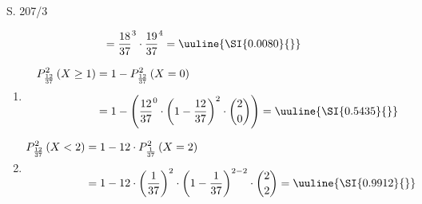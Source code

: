 \begin{Exercise}{S. 207/3}{}
\begin{enumerate}[leftmargin=*]
{\begin{enumerate}[label=\alph*),leftmargin=*]
{\begin{align*}
                    &= \dfrac{18}{37}^{3} \cdot \dfrac{19}{37}^{4} = \uuline{\SI{0.0080}{}}
                \end{align*}
                }
        \end{enumerate}
        \begin{enumerate}[label=\alph*),leftmargin=*]
            \item[b1)] {
                \begin{align*}
                    P_{\frac{12}{37}}^{2}\left(X \geq 1\right) &= 1 - P_{\frac{12}{37}}^{2}\left(X = 0\right)\\[1.5ex]
                    &= 1 - \left(\dfrac{12}{37}^{0} \cdot \left(1 - \dfrac{12}{37}\right)^{2} \cdot \binom{2}{0}\right) = \uuline{\SI{0.5435}{}}
                \end{align*}
                }
            \item[b2)] {
                \begin{align*}
                    P_{\frac{12}{37}}^{2}\left(X < 2\right) &= 1 - 12 \cdot P_{\frac{1}{37}}^{2}\left(X = 2\right)\\[1.5ex]
                    &= 1 - 12 \cdot \left(\dfrac{1}{37}\right)^{2} \cdot \left(1 - \dfrac{1}{37}\right)^{2-2} \cdot \binom{2}{2} = \uuline{\SI{0.9912}{}}
                \end{align*}
                }
        \end{enumerate}
    }
\end{enumerate}
\end{Exercise}
\pagebreak

